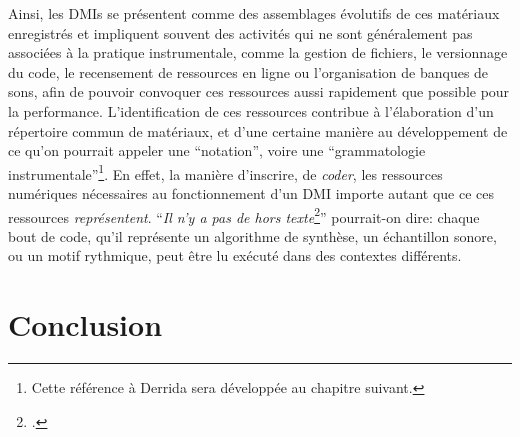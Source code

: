 \indent Ainsi, les \glspl{DMI} se présentent comme des assemblages évolutifs de ces matériaux enregistrés et impliquent souvent des activités qui ne sont généralement pas associées à la pratique instrumentale, comme la gestion de fichiers, le versionnage du code, le recensement de ressources en ligne ou l'organisation de banques de sons, afin de pouvoir convoquer ces ressources aussi rapidement que possible pour la performance. L'identification de ces ressources contribue à l'élaboration d'un répertoire commun de matériaux, et d'une certaine manière au développement de ce qu'on pourrait appeler une ``notation'', voire une ``grammatologie instrumentale''\footnote{Cette référence à Derrida \cite{derrida_grammatologie_1967} sera développée au chapitre suivant.}. En effet, la manière d'inscrire, de \textit{coder}, les ressources numériques nécessaires au fonctionnement d'un \gls{DMI} importe autant que ce ces ressources \textit{représentent}. ``\textit{Il n'y a pas de hors texte}\footnote{\cite{derrida_grammatologie_1967}.}'' pourrait-on dire: chaque bout de code, qu'il représente un algorithme de synthèse, un échantillon sonore, ou un motif rythmique, peut être lu exécuté dans des contextes différents.


\section{Conclusion}

